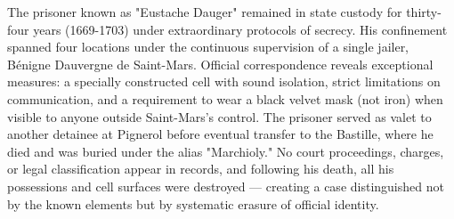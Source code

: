 The prisoner known as "Eustache Dauger" remained in state custody for thirty-four years (1669-1703) under extraordinary protocols of secrecy. His confinement spanned four locations under the continuous supervision of a single jailer, Bénigne Dauvergne de Saint-Mars. Official correspondence reveals exceptional measures: a specially constructed cell with sound isolation, strict limitations on communication, and a requirement to wear a black velvet mask (not iron) when visible to anyone outside Saint-Mars's control. The prisoner served as valet to another detainee at Pignerol before eventual transfer to the Bastille, where he died and was buried under the alias "Marchioly." No court proceedings, charges, or legal classification appear in records, and following his death, all his possessions and cell surfaces were destroyed — creating a case distinguished not by the known elements but by systematic erasure of official identity.
